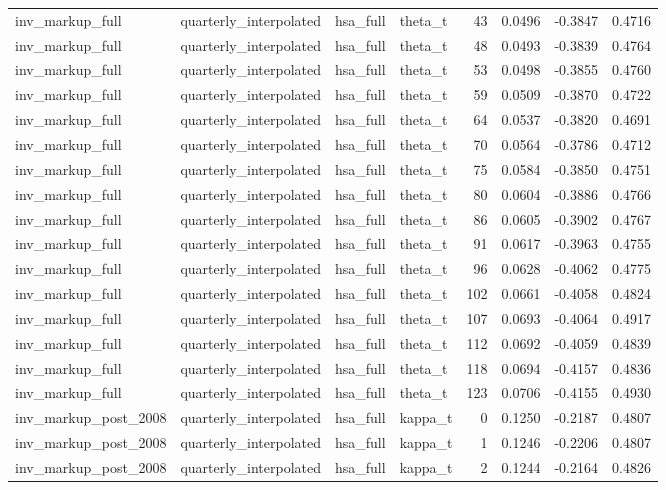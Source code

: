\begin{tabular}{llllrrrr}
inv\_markup\_full & quarterly\_interpolated & hsa\_full & theta\_t & 43 & 0.0496 & -0.3847 & 0.4716 \\
inv\_markup\_full & quarterly\_interpolated & hsa\_full & theta\_t & 48 & 0.0493 & -0.3839 & 0.4764 \\
inv\_markup\_full & quarterly\_interpolated & hsa\_full & theta\_t & 53 & 0.0498 & -0.3855 & 0.4760 \\
inv\_markup\_full & quarterly\_interpolated & hsa\_full & theta\_t & 59 & 0.0509 & -0.3870 & 0.4722 \\
inv\_markup\_full & quarterly\_interpolated & hsa\_full & theta\_t & 64 & 0.0537 & -0.3820 & 0.4691 \\
inv\_markup\_full & quarterly\_interpolated & hsa\_full & theta\_t & 70 & 0.0564 & -0.3786 & 0.4712 \\
inv\_markup\_full & quarterly\_interpolated & hsa\_full & theta\_t & 75 & 0.0584 & -0.3850 & 0.4751 \\
inv\_markup\_full & quarterly\_interpolated & hsa\_full & theta\_t & 80 & 0.0604 & -0.3886 & 0.4766 \\
inv\_markup\_full & quarterly\_interpolated & hsa\_full & theta\_t & 86 & 0.0605 & -0.3902 & 0.4767 \\
inv\_markup\_full & quarterly\_interpolated & hsa\_full & theta\_t & 91 & 0.0617 & -0.3963 & 0.4755 \\
inv\_markup\_full & quarterly\_interpolated & hsa\_full & theta\_t & 96 & 0.0628 & -0.4062 & 0.4775 \\
inv\_markup\_full & quarterly\_interpolated & hsa\_full & theta\_t & 102 & 0.0661 & -0.4058 & 0.4824 \\
inv\_markup\_full & quarterly\_interpolated & hsa\_full & theta\_t & 107 & 0.0693 & -0.4064 & 0.4917 \\
inv\_markup\_full & quarterly\_interpolated & hsa\_full & theta\_t & 112 & 0.0692 & -0.4059 & 0.4839 \\
inv\_markup\_full & quarterly\_interpolated & hsa\_full & theta\_t & 118 & 0.0694 & -0.4157 & 0.4836 \\
inv\_markup\_full & quarterly\_interpolated & hsa\_full & theta\_t & 123 & 0.0706 & -0.4155 & 0.4930 \\
inv\_markup\_post\_2008 & quarterly\_interpolated & hsa\_full & kappa\_t & 0 & 0.1250 & -0.2187 & 0.4807 \\
inv\_markup\_post\_2008 & quarterly\_interpolated & hsa\_full & kappa\_t & 1 & 0.1246 & -0.2206 & 0.4807 \\
inv\_markup\_post\_2008 & quarterly\_interpolated & hsa\_full & kappa\_t & 2 & 0.1244 & -0.2164 & 0.4826 \\

\end{tabular}
